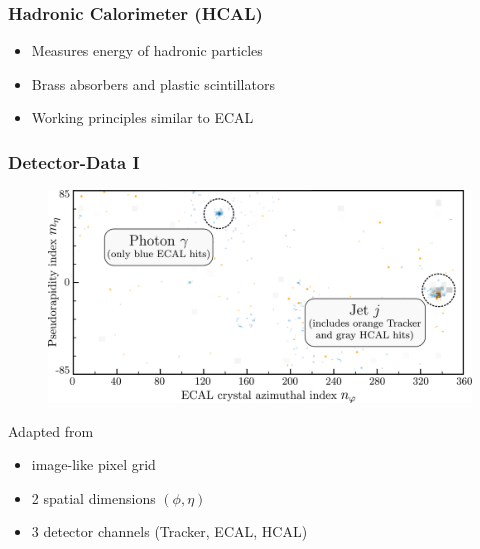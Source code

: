 \documentclass[14pt, t]{beamer}
\begin{document}
\begin{frame}
    \frametitle{Hadronic Calorimeter (HCAL)}
    \begin{itemize}
    
        \item Measures energy of hadronic particles

        \item Brass absorbers and plastic scintillators

        \item Working principles similar to ECAL

    \end{itemize}
    
\end{frame}

\begin{frame}
    \frametitle{Detector-Data I}

    \begin{figure}[htb!]
        \centering
        \includegraphics[width=\linewidth]{raster/raster-svg/event-image.pdf}
    \end{figure}
    \vspace{-9mm}
    \hfill
    {\tiny Adapted from \cite{andrews-higgs}}

    \vspace{-1mm}
    \begin{itemize}
    
        \item image-like pixel grid
        \item 2 spatial dimensions $ (\phi, \eta) $
        \item 3 detector channels (Tracker, ECAL, HCAL)
    
    \end{itemize}

\end{frame}
\end{document}

